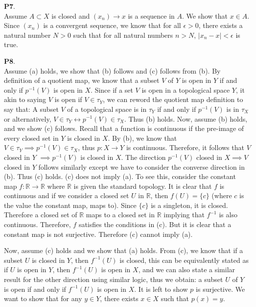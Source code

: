 \documentclass{article}
\begin{document}
    \textbf{P7}.\\
    Assume $A\subset X$ is closed and $(x_n)\to x$ is a sequence in $A$. We show that $x\in A$. Since $(x_n)$ is a convergent sequence, we know that for all
    $\epsilon>0$, there exists a natural number $N>0$ such that for all natural numbers $n>N$, $|x_n-x|<\epsilon$ is true.\newpage

    \textbf{P8}.\\
    Assume (a) holds, we show that (b) follows and (c) follows from (b). By definition of a quotient map, we know that a subset $V$ of $Y$ is open in $Y$ if and only
    if $p^{-1}(V)$ is open in $X$. Since if a set $V$ is open in a topological space $Y$, it akin to saying $V$ is open if $V\in\tau_Y$, we can reword the quotient
    map definition to say that: A subset $V$ of a topological space is in $\tau_Y$ if and only if $p^{-1}(V)$ is in $\tau_X$ or alternatively, $V\in\tau_Y \leftrightarrow
    p^{-1}(V)\in\tau_X$. Thus (b) holds. Now, assume (b) holds, and we show (c) follows. 
    Recall that a function is continuous if the pre-image of every closed set in $Y$ is closed in $X$. By (b), we know that $V\in\tau_Y\implies p^{-1}(V)\in\tau_X$,
    thus $p: X \to Y$ is continuous. Therefore, it follows that $V$ closed in $Y$ $\implies p^{-1}(V)$ is closed in $X$. The direction $p^{-1}(V)$ 
    closed in $X \implies V$ closed in $Y$ follows similarly except we have to consider the converse direction in (b). Thus (c) holds. (c) does not imply (a). To see
    this, consider the constant map $f: \mathbb{R}\to \mathbb{R}$ where $\mathbb{R}$ is given the standard topology. It is clear that $f$ is continuous and if we
    consider a closed set $U$ in $\mathbb{R}$, then $f(U) = \{c\}$ (where $c$ is the value the constant map, maps to). Since $\{c\}$ is a singleton, it is closed.
    Therefore a closed set of $\mathbb{R}$ maps to a closed set in $\mathbb{R}$ implying that $f^{-1}$ is also continuous. Therefore, $f$ satisfies the conditions in
    (c). But it is clear that a constant map is not surjective. Therefore (c) cannot imply (a).
    
    Now, assume (c) holds and we
    show that (a) holds. From (c), we know that if a subset $U$ is closed in $Y$, then $f^{-1}(U)$ is closed, this can be equivalently stated as if $U$ is open
    in $Y$, then $f^{-1}(U)$ is open in $X$, and we can also state a similar result for the other direction using similar logic, thus we obtain: a subset $U$ of $Y$
    is open if and only if $f^{-1}(U)$ is open in $X$. It is left to show $p$ is surjective. We want to show that for any $y\in Y$, there exists $x\in X$ such that
    $p(x) = y$. 
\end{document}
